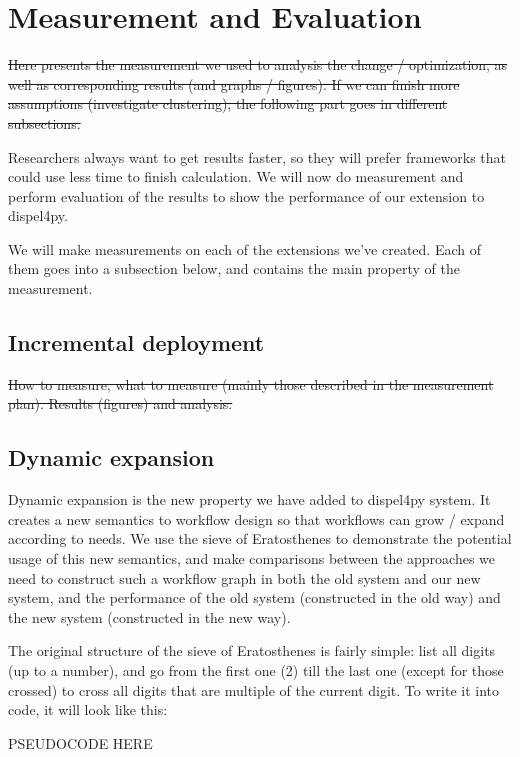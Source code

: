 \chapter{Measurement and Evaluation}
\sout{Here presents the measurement we used to analysis the change / optimization, as well as corresponding results (and graphs / figures).
If we can finish more assumptions (\eg investigate clustering), the following part goes in different subsections.}

Researchers always want to get results faster, so they will prefer frameworks that could use less time to finish calculation. We will now do measurement and perform evaluation of the results to show the performance of our extension to dispel4py.

We will make measurements on each of the extensions we've created. Each of them goes into a subsection below, and contains the main property of the measurement.
\section{Incremental deployment}
\sout{How to measure, what to measure  (mainly those described in the measurement plan).
Results (figures) and analysis.}

\section{Dynamic expansion}
Dynamic expansion is the new property we have added to dispel4py system. It creates a new semantics to workflow design so that workflows can grow / expand according to needs. We use the sieve of Eratosthenes to demonstrate the potential usage of this new semantics, and make comparisons between the approaches we need to construct such a workflow graph in both the old system and our new system, and the performance of the old system (constructed in the old way) and the new system (constructed in the new way).

The original structure of the sieve of Eratosthenes is fairly simple: list all digits (up to a number), and go from the first one (2) till the last one (except for those crossed) to cross all digits that are multiple of the current digit. To write it into code, it will look like this:

PSEUDOCODE HERE

